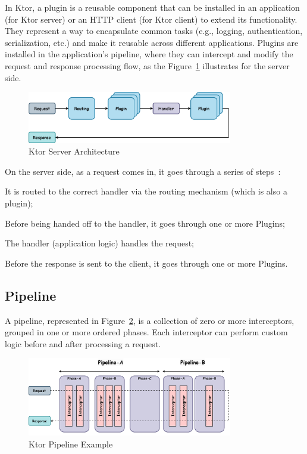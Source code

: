 In Ktor,
a plugin is a reusable component that can be installed in an application
(for Ktor server) or an HTTP client (for Ktor client) to extend its functionality.
They represent a way to encapsulate common tasks (e.g., logging, authentication, serialization, etc.) and make it reusable across different applications.
Plugins are installed in the application's pipeline,
where they can intercept and modify the request and response processing flow,
as the Figure~\ref{fig:ktor-server-architecture} illustrates for the server side.

\begin{figure}[!htb]
    \centering
    \includegraphics[width=0.8\textwidth]{../figures/03_ktor-server-architecture}
    \caption{Ktor Server Architecture}
    \label{fig:ktor-server-architecture}
\end{figure}

On the server side, as a request comes in, it goes through a series of steps~\cite{ktor-server-plugins}:

\begin{boldenumerate}
    \item It is routed to the correct handler via the routing mechanism (which is also a plugin);
    \item Before being handed off to the handler, it goes through one or more Plugins;
    \item The handler (application logic) handles the request;
    \item Before the response is sent to the client, it goes through one or more Plugins.
\end{boldenumerate}

\subsection{Pipeline}\label{subsec:pipeline}

A pipeline, represented in Figure~\ref{fig:ktor-pipeline}, is a collection of zero or more interceptors, grouped in one or more ordered phases.
Each interceptor can perform custom logic before and after processing a request.

\begin{figure}[!htb]
    \centering
    \includegraphics[width=0.8\textwidth]{../figures/03_ktor-pipeline}
    \caption{Ktor Pipeline Example}
    \label{fig:ktor-pipeline}
\end{figure}

